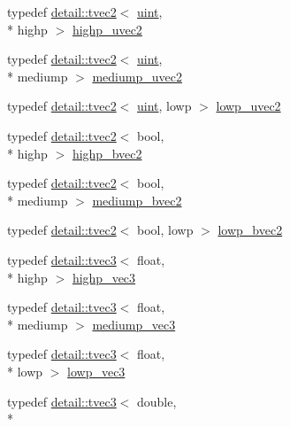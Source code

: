 \begin{DoxyCompactItemize}
\item 
typedef \hyperlink{structglm_1_1detail_1_1tvec2}{detail\-::tvec2}$<$ \hyperlink{group__core__precision_ga4fd29415871152bfb5abd588334147c8}{uint}, \\*
highp $>$ \hyperlink{group__core__precision_gaaf92be4c1fca33cff90c1ed15b521c79}{highp\-\_\-uvec2}
\item 
typedef \hyperlink{structglm_1_1detail_1_1tvec2}{detail\-::tvec2}$<$ \hyperlink{group__core__precision_ga4fd29415871152bfb5abd588334147c8}{uint}, \\*
mediump $>$ \hyperlink{group__core__precision_ga15c8fb77bdb6763ef73b39e02eb98a56}{mediump\-\_\-uvec2}
\item 
typedef \hyperlink{structglm_1_1detail_1_1tvec2}{detail\-::tvec2}$<$ \hyperlink{group__core__precision_ga4fd29415871152bfb5abd588334147c8}{uint}, lowp $>$ \hyperlink{group__core__precision_ga06c64bb528bbecf276ab2d4a2b6c934e}{lowp\-\_\-uvec2}
\item 
typedef \hyperlink{structglm_1_1detail_1_1tvec2}{detail\-::tvec2}$<$ bool, \\*
highp $>$ \hyperlink{group__core__precision_ga4153415d1f3d390219ac9464652ac377}{highp\-\_\-bvec2}
\item 
typedef \hyperlink{structglm_1_1detail_1_1tvec2}{detail\-::tvec2}$<$ bool, \\*
mediump $>$ \hyperlink{group__core__precision_ga1406d96eb96694d91052d3f882658ab2}{mediump\-\_\-bvec2}
\item 
typedef \hyperlink{structglm_1_1detail_1_1tvec2}{detail\-::tvec2}$<$ bool, lowp $>$ \hyperlink{group__core__precision_ga8ff6222d4bb4245106dab0727c8e8a45}{lowp\-\_\-bvec2}
\item 
typedef \hyperlink{structglm_1_1detail_1_1tvec3}{detail\-::tvec3}$<$ float, \\*
highp $>$ \hyperlink{group__core__precision_ga4879124da7a18d6b681d933cb8c4267d}{highp\-\_\-vec3}
\item 
typedef \hyperlink{structglm_1_1detail_1_1tvec3}{detail\-::tvec3}$<$ float, \\*
mediump $>$ \hyperlink{group__core__precision_ga10acc767a046b85205f52ce7f834626f}{mediump\-\_\-vec3}
\item 
typedef \hyperlink{structglm_1_1detail_1_1tvec3}{detail\-::tvec3}$<$ float, \\*
lowp $>$ \hyperlink{group__core__precision_ga062795097526e2758d34cb38387dd82d}{lowp\-\_\-vec3}
\item 
typedef \hyperlink{structglm_1_1detail_1_1tvec3}{detail\-::tvec3}$<$ double, \\*

\end{DoxyCompactItemize}
